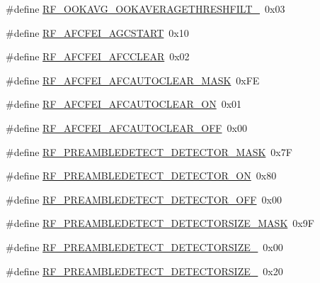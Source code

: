 \begin{DoxyCompactItemize}
\item 
\#define \mbox{\hyperlink{sx1276_regs-_fsk_8h_a5f946cb672cf2b677e28758a94ce65dd}{R\+F\+\_\+\+O\+O\+K\+A\+V\+G\+\_\+\+O\+O\+K\+A\+V\+E\+R\+A\+G\+E\+T\+H\+R\+E\+S\+H\+F\+I\+L\+T\+\_}}~0x03
\item 
\#define \mbox{\hyperlink{sx1276_regs-_fsk_8h_a99a17d7febe804164dd9aabe561ca38b}{R\+F\+\_\+\+A\+F\+C\+F\+E\+I\+\_\+\+A\+G\+C\+S\+T\+A\+RT}}~0x10
\item 
\#define \mbox{\hyperlink{sx1276_regs-_fsk_8h_a30d3f06563697b523ac9d05ae193f40d}{R\+F\+\_\+\+A\+F\+C\+F\+E\+I\+\_\+\+A\+F\+C\+C\+L\+E\+AR}}~0x02
\item 
\#define \mbox{\hyperlink{sx1276_regs-_fsk_8h_a29c1ef8bc89fbd62f2ee2fe4fd84c4c2}{R\+F\+\_\+\+A\+F\+C\+F\+E\+I\+\_\+\+A\+F\+C\+A\+U\+T\+O\+C\+L\+E\+A\+R\+\_\+\+M\+A\+SK}}~0x\+FE
\item 
\#define \mbox{\hyperlink{sx1276_regs-_fsk_8h_a6b142333d65dd99ae62b3b1b4468d192}{R\+F\+\_\+\+A\+F\+C\+F\+E\+I\+\_\+\+A\+F\+C\+A\+U\+T\+O\+C\+L\+E\+A\+R\+\_\+\+ON}}~0x01
\item 
\#define \mbox{\hyperlink{sx1276_regs-_fsk_8h_a49619aa659b86ba6827a8f07aa93ea1e}{R\+F\+\_\+\+A\+F\+C\+F\+E\+I\+\_\+\+A\+F\+C\+A\+U\+T\+O\+C\+L\+E\+A\+R\+\_\+\+O\+FF}}~0x00
\item 
\#define \mbox{\hyperlink{sx1276_regs-_fsk_8h_ad2e43fa3154b37dc7e0425619e018bfa}{R\+F\+\_\+\+P\+R\+E\+A\+M\+B\+L\+E\+D\+E\+T\+E\+C\+T\+\_\+\+D\+E\+T\+E\+C\+T\+O\+R\+\_\+\+M\+A\+SK}}~0x7F
\item 
\#define \mbox{\hyperlink{sx1276_regs-_fsk_8h_ae44badc1d61d3d787bac79bd8ec3855c}{R\+F\+\_\+\+P\+R\+E\+A\+M\+B\+L\+E\+D\+E\+T\+E\+C\+T\+\_\+\+D\+E\+T\+E\+C\+T\+O\+R\+\_\+\+ON}}~0x80
\item 
\#define \mbox{\hyperlink{sx1276_regs-_fsk_8h_a2236d29211449425ac6d2ea24441caa6}{R\+F\+\_\+\+P\+R\+E\+A\+M\+B\+L\+E\+D\+E\+T\+E\+C\+T\+\_\+\+D\+E\+T\+E\+C\+T\+O\+R\+\_\+\+O\+FF}}~0x00
\item 
\#define \mbox{\hyperlink{sx1276_regs-_fsk_8h_ac6926dd5bf77faf266c0755554312b3e}{R\+F\+\_\+\+P\+R\+E\+A\+M\+B\+L\+E\+D\+E\+T\+E\+C\+T\+\_\+\+D\+E\+T\+E\+C\+T\+O\+R\+S\+I\+Z\+E\+\_\+\+M\+A\+SK}}~0x9F
\item 
\#define \mbox{\hyperlink{sx1276_regs-_fsk_8h_a1ffab2e1b21abc6180629831a8cf95bc}{R\+F\+\_\+\+P\+R\+E\+A\+M\+B\+L\+E\+D\+E\+T\+E\+C\+T\+\_\+\+D\+E\+T\+E\+C\+T\+O\+R\+S\+I\+Z\+E\+\_}}~0x00
\item 
\#define \mbox{\hyperlink{sx1276_regs-_fsk_8h_a5301fc89f558a18b6b8770986c726753}{R\+F\+\_\+\+P\+R\+E\+A\+M\+B\+L\+E\+D\+E\+T\+E\+C\+T\+\_\+\+D\+E\+T\+E\+C\+T\+O\+R\+S\+I\+Z\+E\+\_}}~0x20

\end{DoxyCompactItemize}
